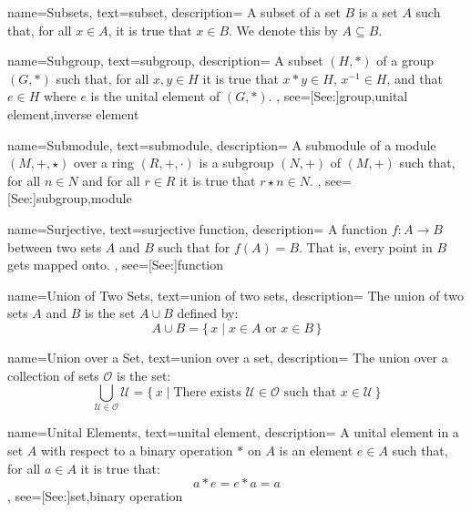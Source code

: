 {
    name={Subsets},
    text={subset},
    description={
        A subset of a set $B$ is a set $A$ such that, for all $x\in{A}$, it is
        true that $x\in{B}$. We denote this by $A\subseteq{B}$.
    }
}

{
    name={Subgroup},
    text={subgroup},
    description={
        A subset $(H,*)$ of a group $(G,*)$ such that, for all $x,y\in{H}$ it
        is true that $x*y\in{H}$, $x^{\minus{1}}\in{H}$, and that $e\in{H}$ where
        $e$ is the unital element of $(G,*)$.
    },
    see=[See:]{group,unital element,inverse element}
}

{
    name={Submodule},
    text={submodule},
    description={
        A submodule of a module $(M,\boldsymbol{+},\star)$ over a ring
        $(R,+,\cdot)$ is a subgroup $(N,\boldsymbol{+})$ of
        $(M,\boldsymbol{+})$ such that, for all $n\in{N}$ and for all $r\in{R}$
        it is true that $r\star{n}\in{N}$.
    },
    see=[See:]{subgroup,module}
}

{
    name={Surjective},
    text={surjective function},
    description={
        A function $f:A\rightarrow{B}$ between two sets $A$ and $B$ such that
        for $f(A)=B$. That is, every point in $B$ gets mapped onto.
    },
    see=[See:]{function}
}

{
    name={Union of Two Sets},
    text={union of two sets},
    description={
            The union of two sets $A$ and $B$ is the set $A\cup{B}$
            defined by:
            \begin{equation*}
                A\cup{B}=\big\{\,x\;|\;x\in{A}\textrm{ or }x\in{B}\,\big\}
            \end{equation*}
    }
}

{
    name={Union over a Set},
    text={union over a set},
    description={
        The union over a collection of sets $\mathcal{O}$ is the set:
        \begin{equation*}
            \bigcup_{\mathcal{U}\in\mathcal{O}}\mathcal{U}
            =\big\{\,x\;|\;\textrm{There exists }\mathcal{U}\in\mathcal{O}
                \textrm{ such that }x\in\mathcal{U}\,\big\}
        \end{equation*}
    }
}

{
    name={Unital Elements},
    text={unital element},
    description={
        A unital element in a set $A$ with respect to a binary operation
        $*$ on $A$ is an element $e\in{A}$ such that, for all $a\in{A}$
        it is true that:
        \begin{equation*}
            a*e=e*a=a
        \end{equation*}
    },
    see=[See:]{set,binary operation}
}




